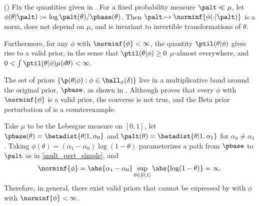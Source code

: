 \begin{lem}
%
(\citet{gustafson:1996:local})
%
Fix the quantities given in .  For a fixed probability
measure $\palt \ll \mu$, let $\phi(\theta \vert \palt) := \log \palt(\theta) /
\pbase(\theta)$.  Then $\palt \mapsto \norminf{\phi(\cdot \vert \palt)}$ is a
norm, does not depend on $\mu$, and is invariant to invertible transformations
of $\theta$.

Furthermore, for any $\phi$ with $\norminf{\phi} < \infty$, the quantity
$\ptil(\theta \vert \phi)$ gives rise to a valid prior, in the sense that
$\ptil(\theta \vert \phi) \ge 0$ $\mu$-almost everywhere, and
$0 < \int \ptil(\theta \vert \phi) \mu(d\theta) < \infty$.
%
%
\end{lem}

The set of priors $\left\{\p(\theta \vert \phi) : \phi \in
\ball_\phi(\delta)\right\}$ live in a multiplicative band around the original
prior, $\pbase$, as shown in . Although
 proves that every $\phi$ with $\norminf{\phi}$ is a
valid prior, the converse is not true, and the Beta prior perturbation of
 is a counterexample.

\FunctionBallFig{}


\begin{ex}
%
Take $\mu$ to be the Lebesgue measure on $[0,1]$, let $\pbase(\theta) =
\betadist{\theta \vert 1, \alpha_0}$ and $\palt(\theta) = \betadist{\theta \vert
1, \alpha_1}$ for $\alpha_0 \ne \alpha_1$.  Taking
$\phi(\theta) = (\alpha_1 - \alpha_0) \log(1 - \theta)$ parameterizes
a path from $\pbase$ to $\palt$ as in \eqref{mult_pert_simple}, and
%
\begin{align*}
%
\norminf{\phi} =
    \abs{\alpha_1 - \alpha_0} \sup_{\theta \in [0,1]} \abs{\log(1 - \theta)} =
    \infty.
%
\end{align*}
%
Therefore, in general, there exist valid priors that cannot be expressed by
 with $\phi$ with $\norminf{\phi} < \infty$.
%
\end{ex}

